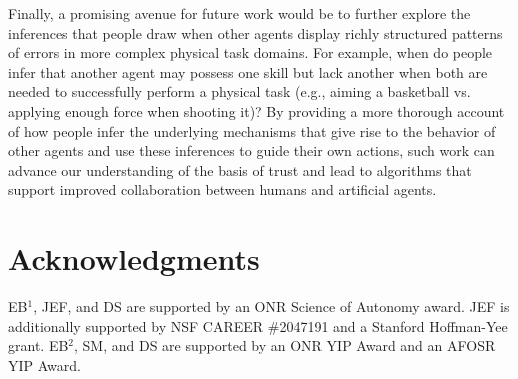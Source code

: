 \documentclass[10pt,letterpaper]{article}
\begin{document}
Finally, a promising avenue for future work would be to further explore the inferences that people draw when other agents display richly structured patterns of errors in more complex physical task domains. For example, when do people infer that another agent may possess one skill but lack another when both are needed to successfully perform a physical task (e.g., aiming a basketball vs. applying enough force when shooting it)? By providing a more thorough account of how people infer the underlying mechanisms that give rise to the behavior of other agents and use these inferences to guide their own actions, such work can advance our understanding of the basis of trust and lead to algorithms that support improved collaboration between humans and artificial agents.


\newpage

\section{Acknowledgments}
EB$^{1}$, JEF, and DS are supported by an ONR Science of Autonomy award. 
JEF is additionally supported by NSF CAREER \#2047191 and a Stanford Hoffman-Yee grant. 
EB$^{2}$, SM, and DS are supported by an ONR YIP Award and an AFOSR YIP Award.









\setlength{\bibleftmargin}{.125in}
\setlength{\bibindent}{-\bibleftmargin}
\typeout{} %

\end{document}
